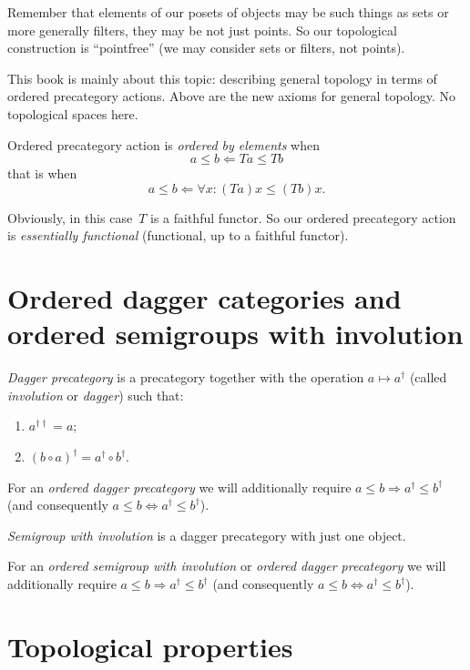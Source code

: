 Remember that elements of our posets of objects may be such things as sets or more generally filters, they may be not just points. So our topological construction is ``pointfree'' (we may consider sets or filters, not points).

This book is mainly about this topic: describing general topology in terms of ordered precategory actions. Above are the new axioms for general topology. No topological spaces here.

Ordered precategory action is \emph{ordered by elements} when \[ a\leq b \Leftarrow Ta\leq Tb \] that is when \[ a\leq b \Leftarrow \forall x:(Ta)x\leq(Tb)x. \]

Obviously, in this case~$T$ is a faithful functor. So our ordered precategory action is \emph{essentially functional} (functional, up to a faithful functor).

\chapter{Ordered dagger categories and ordered semigroups with involution}

\begin{defn}
\emph{Dagger precategory} is a precategory together with the operation $a\mapsto a^{\dagger}$ (called \emph{involution} or \emph{dagger}) such that:
\begin{enumerate}
\item $a^{\dagger\dagger} = a$;
\item $(b\circ a)^{\dagger} = a^{\dagger}\circ b^{\dagger}$.
\end{enumerate}
\end{defn}

For an \emph{ordered dagger precategory} we will additionally require $a\leq b\Rightarrow a^{\dagger}\leq b^{\dagger}$ (and consequently $a\leq b\Leftrightarrow a^{\dagger}\leq b^{\dagger}$).

\begin{defn}
\emph{Semigroup with involution} is a dagger precategory with just one object.
\end{defn}

For an \emph{ordered semigroup with involution} or \emph{ordered dagger precategory} we will additionally require $a\leq b\Rightarrow a^{\dagger}\leq b^{\dagger}$ (and consequently $a\leq b\Leftrightarrow a^{\dagger}\leq b^{\dagger}$).

\chapter{Topological properties}

